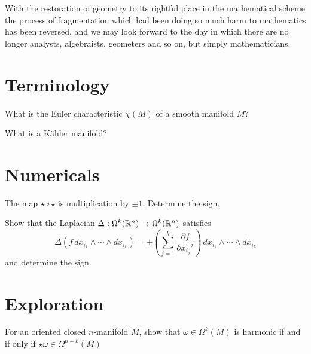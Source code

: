 \documentclass{homework}
\author{Jim Fowler}
\begin{document}
\maketitle

\begin{inspiration}
 With the restoration of geometry to its rightful place in the mathematical scheme the process of fragmentation which had been doing so much harm to mathematics has been reversed, and we may look forward to the day in which there are no longer analysts, algebraists, geometers and so on, but simply mathematicians.
\end{inspiration}

\section{Terminology}

\begin{problem}
 What is the Euler characteristic $\chi(M)$ of a smooth manifold $M$? 
\end{problem}

\begin{problem}
What is a K\"ahler manifold?
\end{problem}

\section{Numericals}

\begin{problem} The map $\star \circ \star$ is multiplication by $\pm
1$.  Determine the sign.
\end{problem}

\begin{problem}
  Show that the Laplacian $\Delta : \Omega^k(\mathbb{R}^n) \to \Omega^k(\mathbb{R}^n)$  satisfies
  \[
    \Delta \left( f \, dx_{i_1} \wedge \cdots \wedge dx_{i_k} \right) = \pm \left( \sum_{j=1}^k \frac{\partial f}{\partial {x_{i_j}}^2} \right) \, dx_{i_1} \wedge \cdots \wedge dx_{i_k}
  \]
and determine the sign.
\end{problem}

\section{Exploration}

\begin{problem} For an oriented closed $n$-manifold $M$, show that
$\omega \in \Omega^k(M)$ is harmonic if and if only if $\star \omega
\in \Omega^{n-k}(M)$
\end{problem}
\end{document}
